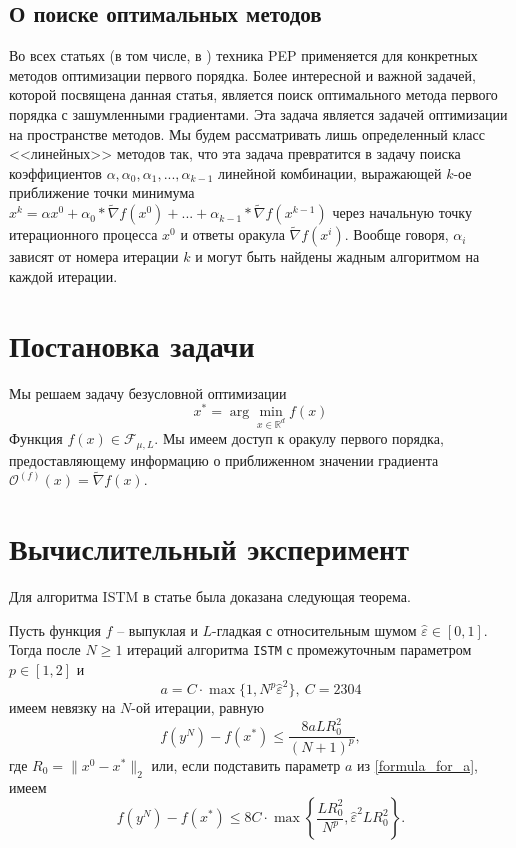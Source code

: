 \documentclass{article}
\newcommand{\R}{\mathbb{R}}
\begin{document}
\subsection{О поиске оптимальных методов}
Во всех статьях (в том числе, в \cite{kornilov2023intermediate}) техника PEP применяется для конкретных методов оптимизации первого порядка. Более интересной и важной задачей, которой посвящена данная статья, является поиск оптимального метода первого порядка с зашумленными градиентами. Эта задача является задачей оптимизации на пространстве методов. Мы будем рассматривать лишь определенный класс <<линейных>> методов так, что эта задача превратится в задачу поиска коэффициентов $\alpha, \alpha_0, \alpha_1, ... , \alpha_{k-1}$ линейной комбинации, выражающей $k$-ое приближение точки минимума $x^{k} = \alpha x^0 + \alpha_0 * \widetilde{\nabla} f(x^0) + ... + \alpha_{k-1} *\widetilde{\nabla} f(x^{k - 1})$ через начальную точку итерационного процесса $x^0$ и ответы оракула $\widetilde{\nabla} f(x^i)$. Вообще говоря, $\alpha_i$ зависят от номера итерации $k$ и могут быть найдены жадным алгоритмом на каждой итерации.

\section{Постановка задачи}
Мы решаем задачу безусловной оптимизации \[x^* = \arg \min_{x \in \R^d} f(x)\]
Функция $f(x) \in \mathcal{F}_{\mu, L}$. Мы имеем доступ к оракулу первого порядка, предоставляющему информацию о приближенном значении градиента $\mathcal{O}^{(f)} (x) = \widetilde{\nabla} f(x)$. 

\section{Вычислительный эксперимент}
Для алгоритма ISTM в статье \cite{kornilov2023intermediate} была доказана следующая теорема.

\begin{theorem}\label{theo:coveregence_alg1}
Пусть функция $f$ -- выпуклая и $L$-гладкая с относительным шумом $\hat{\varepsilon} \in [0,1]$. Тогда после $N\geq 1$ итераций алгоритма  \texttt{ISTM} с промежуточным параметром $p \in [1,2]$ и 
\begin{equation}\label{formula_for_a}
    a = C \cdot \max{\{1, N^p \hat{\varepsilon}^2\}},\ C = 2304
\end{equation}
имеем невязку на $N$-ой итерации, равную 
\begin{equation}\label{conv_rate_alg1}
    f(y^N) - f(x^*) \leq \frac{8 a L R_0^2}{(N+1)^p},
\end{equation}
где $R_0 = \|x^0 - x^*\|_2$ 
или, если подставить параметр $a$ из \eqref{formula_for_a}, имеем
\begin{equation}\label{eq:conv_rate_alg1_proper_a}
f(y^N) - f(x^*) \leq 8C \cdot \max \left\{ \frac{LR_0^2}{N^p}, \hat{\varepsilon}^2 L R_0^2 \right\}.
\end{equation}
\end{theorem}
\end{document}
